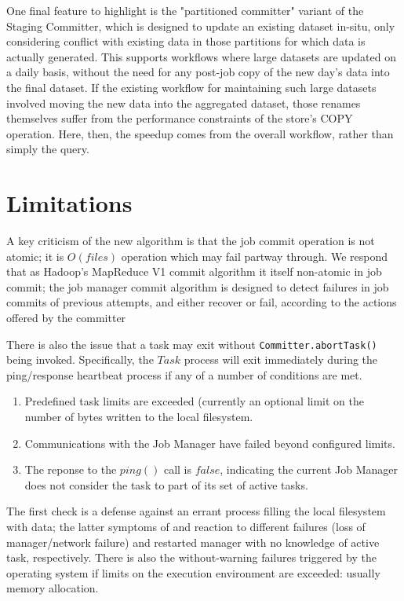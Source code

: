 \documentclass[9pt,technote]{IEEEtran}
\begin{document}
One final feature to highlight is the "partitioned committer" variant
of the Staging Committer, which is designed to update an existing
dataset in-situ, only considering conflict with existing data in
those partitions for which data is actually generated.
This supports workflows where large datasets are updated on a daily basis,
without the need for any post-job copy of the new day's data into the
final dataset.
If the existing workflow for maintaining such large datasets involved
moving the new data into the aggregated dataset, those renames themselves
suffer from the performance constraints of the store's COPY operation.
Here, then, the speedup comes from the overall workflow, rather than
simply the query.






\section{Limitations}
\label{sec:limitations}

A key criticism of the new algorithm is that the job commit operation is not atomic;
it is $O(files)$ operation which may fail partway through.
We respond that as Hadoop's MapReduce V1 commit algorithm it itself non-atomic in job commit;
the job manager commit algorithm is designed to detect failures in job commits
of previous attempts, and either recover or fail, according to the actions
offered by the committer

There is also the issue that a task may exit without \texttt{Committer.abortTask()}
being invoked.
Specifically, the $Task$ process will exit immediately during the ping/response
heartbeat process if any of a number of conditions are met.
\begin{enumerate}
  \item Predefined task limits are exceeded
  (currently an optional limit on the number of bytes written to the local filesystem.
  \item Communications with the Job Manager have failed beyond configured limits.
  \item The reponse to the $ping()$ call is $false$, indicating the current
  Job Manager does not consider the task to part of its set of active tasks.
\end{enumerate}

The first check is a defense against an errant process filling the local
filesystem with data;
the latter symptoms of and reaction to different failures (loss of manager/network failure)
and restarted manager with no knowledge of active task, respectively.
There is also the without-warning failures triggered by the operating system
if limits on the execution environment are exceeded: usually memory allocation.
\end{document}

